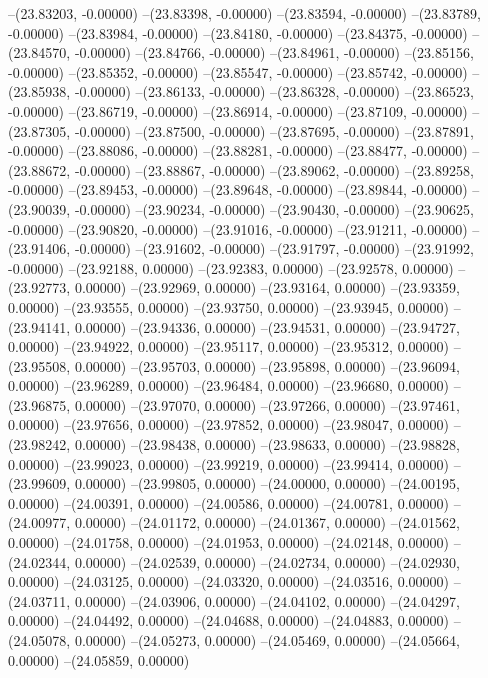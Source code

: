 --(23.83203, -0.00000)
--(23.83398, -0.00000)
--(23.83594, -0.00000)
--(23.83789, -0.00000)
--(23.83984, -0.00000)
--(23.84180, -0.00000)
--(23.84375, -0.00000)
--(23.84570, -0.00000)
--(23.84766, -0.00000)
--(23.84961, -0.00000)
--(23.85156, -0.00000)
--(23.85352, -0.00000)
--(23.85547, -0.00000)
--(23.85742, -0.00000)
--(23.85938, -0.00000)
--(23.86133, -0.00000)
--(23.86328, -0.00000)
--(23.86523, -0.00000)
--(23.86719, -0.00000)
--(23.86914, -0.00000)
--(23.87109, -0.00000)
--(23.87305, -0.00000)
--(23.87500, -0.00000)
--(23.87695, -0.00000)
--(23.87891, -0.00000)
--(23.88086, -0.00000)
--(23.88281, -0.00000)
--(23.88477, -0.00000)
--(23.88672, -0.00000)
--(23.88867, -0.00000)
--(23.89062, -0.00000)
--(23.89258, -0.00000)
--(23.89453, -0.00000)
--(23.89648, -0.00000)
--(23.89844, -0.00000)
--(23.90039, -0.00000)
--(23.90234, -0.00000)
--(23.90430, -0.00000)
--(23.90625, -0.00000)
--(23.90820, -0.00000)
--(23.91016, -0.00000)
--(23.91211, -0.00000)
--(23.91406, -0.00000)
--(23.91602, -0.00000)
--(23.91797, -0.00000)
--(23.91992, -0.00000)
--(23.92188, 0.00000)
--(23.92383, 0.00000)
--(23.92578, 0.00000)
--(23.92773, 0.00000)
--(23.92969, 0.00000)
--(23.93164, 0.00000)
--(23.93359, 0.00000)
--(23.93555, 0.00000)
--(23.93750, 0.00000)
--(23.93945, 0.00000)
--(23.94141, 0.00000)
--(23.94336, 0.00000)
--(23.94531, 0.00000)
--(23.94727, 0.00000)
--(23.94922, 0.00000)
--(23.95117, 0.00000)
--(23.95312, 0.00000)
--(23.95508, 0.00000)
--(23.95703, 0.00000)
--(23.95898, 0.00000)
--(23.96094, 0.00000)
--(23.96289, 0.00000)
--(23.96484, 0.00000)
--(23.96680, 0.00000)
--(23.96875, 0.00000)
--(23.97070, 0.00000)
--(23.97266, 0.00000)
--(23.97461, 0.00000)
--(23.97656, 0.00000)
--(23.97852, 0.00000)
--(23.98047, 0.00000)
--(23.98242, 0.00000)
--(23.98438, 0.00000)
--(23.98633, 0.00000)
--(23.98828, 0.00000)
--(23.99023, 0.00000)
--(23.99219, 0.00000)
--(23.99414, 0.00000)
--(23.99609, 0.00000)
--(23.99805, 0.00000)
--(24.00000, 0.00000)
--(24.00195, 0.00000)
--(24.00391, 0.00000)
--(24.00586, 0.00000)
--(24.00781, 0.00000)
--(24.00977, 0.00000)
--(24.01172, 0.00000)
--(24.01367, 0.00000)
--(24.01562, 0.00000)
--(24.01758, 0.00000)
--(24.01953, 0.00000)
--(24.02148, 0.00000)
--(24.02344, 0.00000)
--(24.02539, 0.00000)
--(24.02734, 0.00000)
--(24.02930, 0.00000)
--(24.03125, 0.00000)
--(24.03320, 0.00000)
--(24.03516, 0.00000)
--(24.03711, 0.00000)
--(24.03906, 0.00000)
--(24.04102, 0.00000)
--(24.04297, 0.00000)
--(24.04492, 0.00000)
--(24.04688, 0.00000)
--(24.04883, 0.00000)
--(24.05078, 0.00000)
--(24.05273, 0.00000)
--(24.05469, 0.00000)
--(24.05664, 0.00000)
--(24.05859, 0.00000)
